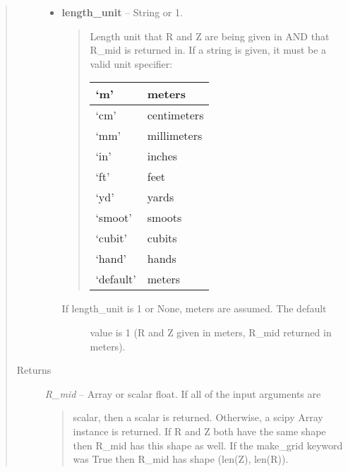 \documentclass[letterpaper,10pt,english]{sphinxmanual}
\begin{document}
\begin{fulllineitems}
\begin{fulllineitems}
\begin{quote}
\begin{description}
\begin{itemize}
\item {} 
\textbf{length\_unit} --
String or 1.
\begin{quote}

Length unit that R and Z are being given
in AND that R\_mid is returned in. If a string is given, it
must be a valid unit specifier:

\begin{tabulary}{\linewidth}{|L|L|}
\hline

`m'
 & 
meters
\\\hline

`cm'
 & 
centimeters
\\\hline

`mm'
 & 
millimeters
\\\hline

`in'
 & 
inches
\\\hline

`ft'
 & 
feet
\\\hline

`yd'
 & 
yards
\\\hline

`smoot'
 & 
smoots
\\\hline

`cubit'
 & 
cubits
\\\hline

`hand'
 & 
hands
\\\hline

`default'
 & 
meters
\\\hline
\end{tabulary}

\end{quote}
\begin{description}
\item[{If length\_unit is 1 or None, meters are assumed. The default}] \leavevmode
value is 1 (R and Z given in meters, R\_mid returned in meters).

\end{description}

\end{itemize}

\item[{Returns}] \leavevmode

\emph{R\_mid} --
Array or scalar float. If all of the input arguments are
\begin{quote}

scalar, then a scalar is returned. Otherwise, a scipy Array
instance is returned. If R and Z both have the same shape then
R\_mid has this shape as well. If the make\_grid keyword was True
then R\_mid has shape (len(Z), len(R)).
\end{quote}



\end{description}
\end{quote}
\end{fulllineitems}
\end{fulllineitems}
\end{document}
